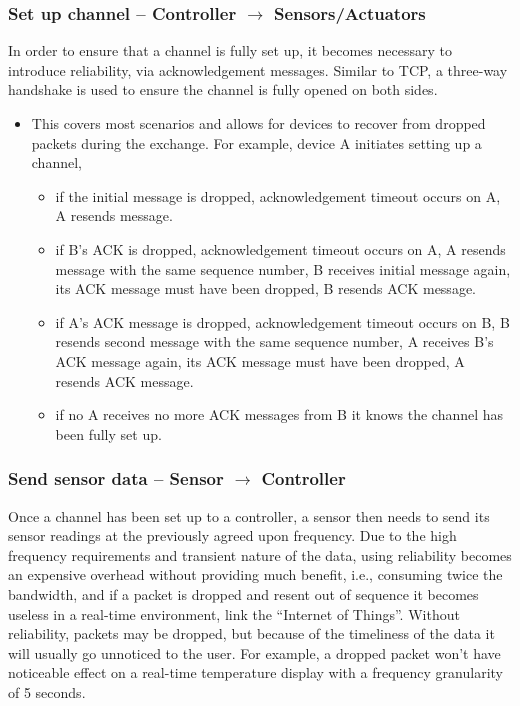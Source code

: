 
\subsubsection{Set up channel -- Controller $\rightarrow$ Sensors/Actuators} %
\label{ssub:set_up_channel}
In order to ensure that a channel is fully set up, it becomes necessary to introduce reliability, via acknowledgement messages. Similar to TCP, a three-way handshake is used to ensure the channel is fully opened on both sides.

\begin{itemize}
 	\item This covers most scenarios and allows for devices to recover from dropped packets during the exchange. For example, device A initiates setting up a channel,
 	\begin{itemize}
 		\item if the initial message is dropped, acknowledgement timeout occurs on A, A resends message.
 		\item if B's ACK is dropped, acknowledgement timeout occurs on A, A resends message with the same sequence number, B receives initial message again, its ACK message must have been dropped, B resends ACK message.
 		\item if A's ACK message is dropped, acknowledgement timeout occurs on B, B resends second message with the same sequence number, A receives B's ACK message again, its ACK message must have been dropped, A resends ACK message.
 		\item if no A receives no more ACK messages from B it knows the channel has been fully set up.
 	\end{itemize}
 \end{itemize} 

\subsubsection{Send sensor data -- Sensor $\rightarrow$ Controller} %
\label{ssub:send_sensor_data}
Once a channel has been set up to a controller, a sensor then needs to send its sensor readings at the previously agreed upon frequency. 
Due to the high frequency requirements and transient nature of the data, using reliability becomes an expensive overhead without providing much benefit, i.e., consuming twice the bandwidth, and if a packet is dropped and resent out of sequence it becomes useless in a real-time environment, link the ``Internet of Things''.  
Without reliability, packets may be dropped, but because of the timeliness of the data it will usually go unnoticed to the user. For example, a dropped packet won't have noticeable effect on a real-time temperature display with a frequency granularity of 5 seconds.

